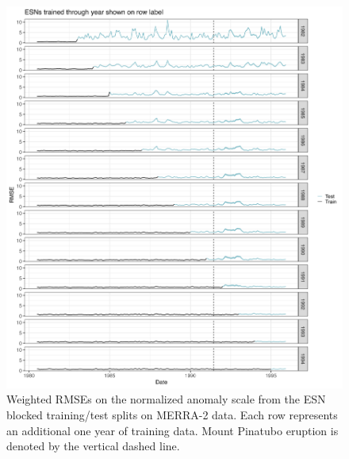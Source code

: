 \documentclass[AMS,STIX2COL]{WileyNJD-v2}
\begin{document}
\begin{figure}[h]
    \centering
    \includegraphics[width=\textwidth]{figures/merra2_rmse_anom.png}
    \caption{Weighted RMSEs on the normalized anomaly scale from the ESN blocked training/test splits on MERRA-2 data. Each row represents an additional one year of training data. Mount Pinatubo eruption is denoted by the vertical dashed line.}
    \label{fig:merra2rmseanom}
\end{figure}
\end{document}
